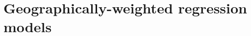\documentclass[authoryear, review, 11pt]{elsarticle}
\begin{document}
%		
  
	
\section{Geographically-weighted regression models \label{section:model}}
\end{document}
